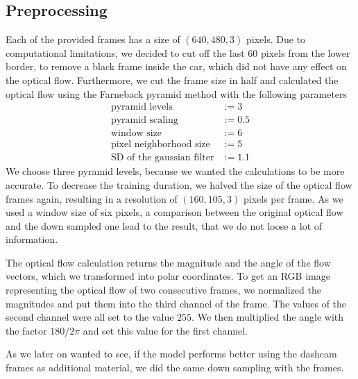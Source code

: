 \documentclass[conference]{IEEEtran}
\begin{document}
\subsection{Preprocessing}
Each of the provided frames has a size of $(640,480,3)$ pixels. Due to computational limitations, we decided to cut off the last 60 pixels from the lower border, to remove a black frame inside the car, which did not have any effect on the optical flow. Furthermore, we cut the frame size in half and calculated the optical flow using the Farneback pyramid \cite{Farneback2003} method with the following parameters
\begin{align*}
\text{pyramid levels} &:= 3\\
\text{pyramid scaling} &:= 0.5\\
\text{window size} &:= 6\\
\text{pixel neighborhood size} &:= 5\\
\text{SD of the gaussian filter} &:= 1.1
\end{align*}
We choose three pyramid levels, because we wanted the calculations to be more accurate. To decrease the training duration, we halved 
the size of the optical flow frames again, resulting in a resolution of
$(160,105,3)$ pixels per frame. As we used a window size of six pixels, a comparison between the original optical flow and the down 
sampled one lead to the result, that we do not loose a lot of information.

The optical flow calculation returns the magnitude and
the angle of the flow vectors, which we transformed into polar coordinates. To get an RGB image representing the
optical flow of two consecutive frames, we normalized the magnitudes and put them into the third channel of the frame. The values
of the second channel were all set to the value $255$. We then multiplied the angle with the factor $180/2\pi$ and set this value 
for the first channel.

As we later on wanted to see, if the model performs 
better using the dashcam frames as additional material, we did the same down sampling with the frames.

\end{document}
